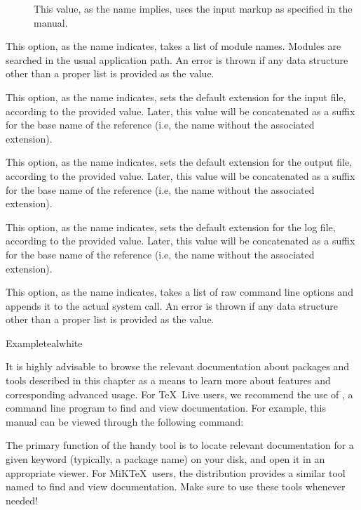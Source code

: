 \begin{description}
\begin{description}
\begin{description}
\item[] This value, as the name implies, uses the  input markup as specified in the  manual.
\end{description}

\item[\abox{modules}] This option, as the name indicates, takes a list of module names. Modules are searched in the usual application path. An error is thrown if any data structure other than a proper list is provided as the value.

\item[\rpbox{input}{idx}] This option, as the name indicates, sets the default extension for the input file, according to the provided value. Later, this value will be concatenated as a suffix for the base name of the  reference (i.e, the name without the associated extension).

\item[\rpbox{output}{ind}] This option, as the name indicates, sets the default extension for the output file, according to the provided value. Later, this value will be concatenated as a suffix for the base name of the  reference (i.e, the name without the associated extension).

\item[\rpbox{log}{ilg}] This option, as the name indicates, sets the default extension for the log file, according to the provided value. Later, this value will be concatenated as a suffix for the base name of the  reference (i.e, the name without the associated extension).

\item[\abox{options}] This option, as the name indicates, takes a list of raw command line options and appends it to the actual system call. An error is thrown if any data structure other than a proper list is provided as the value.
\end{description}

\begin{codebox}{Example}{teal}{\icnote}{white}
\end{codebox}
\end{description}

It is highly advisable to browse the relevant documentation about packages and tools described in this chapter as a means to learn more about features and corresponding advanced usage. For \TeX\ Live users, we recommend the use of , a command line program to find and view documentation. For example, this manual can be viewed through the following command:


The primary function of the handy  tool is to locate relevant documentation for a given keyword (typically, a package name) on your disk, and open it in an appropriate viewer. For MiK\TeX\ users, the distribution provides a similar tool named  to find and view documentation. Make sure to use these tools whenever needed!
